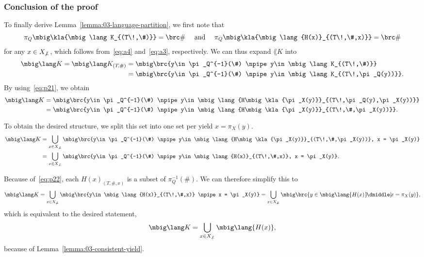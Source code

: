 \subsubsection*{Conclusion of the proof}

To finally derive Lemma~\ref{lemma:03-language-partition}, we first note that
\begin{equation}\label{eq:p22}
 \pi_Q\mbig\kla{\mbig\lang K_{(T\!,\#)}} = \brc\#
 \quad\text{ and }\quad
 \pi_Q\mbig\kla{\mbig\lang{H(x)}_{(T\!,\#,x)}} = \brc\#
\end{equation}
for any $x\in X_{\not\bot}$, which follows from~\eqref{eq:a4} and~\eqref{eq:a3}, respectively.
We can thus expand $\lang K$ into
\begin{align*}
 \mbig\lang K
 = \mbig\lang K_{(T\!,\#)}
 &= \mbig\brc{y\in \pi_Q^{-1}(\#) \npipe y\in\mbig\lang K_{(T\!,\#)}} \\
 &= \mbig\brc{y\in \pi_Q^{-1}(\#) \npipe y\in\mbig\lang K_{(T\!,\pi_Q(y))}}.
\end{align*}
By using~\eqref{eq:p21}, we obtain
\begin{align*}
 \mbig\lang K
 &= \mbig\brc{y\in \pi_Q^{-1}(\#) \npipe y\in\mbig\lang{H\mbig\kla{\pi_X(y)}}_{(T\!,\pi_Q(y),\pi_X(y))}} \\
 &= \mbig\brc{y\in \pi_Q^{-1}(\#) \npipe y\in\mbig\lang{H\mbig\kla{\pi_X(y)}}_{(T\!,\#,\pi_X(y))}}.
\end{align*}

To obtain the desired structure, we split this set into one set per yield $x = \pi_X(y)$.
\begin{align*}
 \mbig\lang K
 &= \bigcup_{x\in X_{\not\bot}} \mbig\brc{y\in \pi_Q^{-1}(\#) \npipe y\in\mbig\lang{H\mbig\kla{\pi_X(y)}}_{(T\!,\#,\pi_X(y))}, x = \pi_X(y)} \\
 &= \bigcup_{x\in X_{\not\bot}} \mbig\brc{y\in \pi_Q^{-1}(\#) \npipe y\in\mbig\lang{H(x)}_{(T\!,\#,x)}, x = \pi_X(y)}.
\end{align*}

Because of~\eqref{eq:p22}, each $H(x)_{(T,\#,x)}$ is a subset of $\pi_Q^{-1}(\#)$. We can therefore simplify this to
\[
 \mbig\lang K
 = \bigcup_{x\in X_{\not\bot}} \mbig\brc{y\in \mbig\lang{H(x)}_{(T\!,\#,x)} \npipe x = \pi_X(y)}
 = \bigcup_{x\in X_{\not\bot}} \mbig\brc{y\in \mbig\lang{H(x)} \npipe x = \pi_X(y)},
\]
which is equivalent to the desired statement,
\[
 \mbig\lang K = \bigcup_{x\in X_{\not\bot}} \mbig\lang{H(x)},
\]
because of Lemma~\ref{lemma:03-consistent-yield}.
